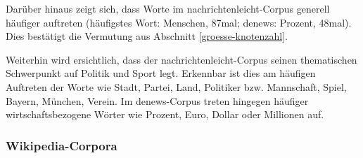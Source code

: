 \documentclass[11pt, a4paper]{article}
\begin{document}
Darüber hinaus zeigt sich, dass Worte im nachrichtenleicht-Corpus generell
häufiger auftreten (häufigstes Wort: Menschen, 87mal; denews: Prozent, 48mal).
Dies bestätigt die Vermutung aus Abschnitt \ref{groesse-knotenzahl}.

Weiterhin wird ersichtlich, dass der nachrichtenleicht-Corpus seinen
thematischen Schwerpunkt auf Politik und Sport legt.
Erkennbar ist dies am häufigen Auftreten der Worte wie Stadt, Partei, Land,
Politiker bzw. Mannschaft, Spiel, Bayern, München, Verein.
Im denews-Corpus treten hingegen häufiger wirtschaftsbezogene Wörter wie Prozent,
Euro, Dollar oder Millionen auf.


\subsubsection{Wikipedia-Corpora}
\end{document}
